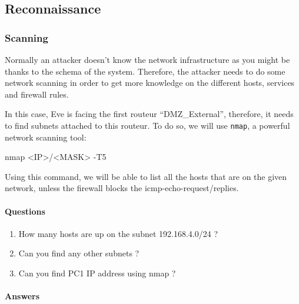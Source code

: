 \documentclass[a4paper,11pt,singlespacing]{article}
\newenvironment{Shaded}{}{}
\newcommand{\FunctionTok}[1]{\textcolor[rgb]{0.02,0.16,0.49}{#1}}
\newcommand{\NormalTok}[1]{#1}
\newcommand{\OperatorTok}[1]{\textcolor[rgb]{0.40,0.40,0.40}{#1}}
\providecommand{\tightlist}{%
  \setlength{\itemsep}{0pt}\setlength{\parskip}{0pt}}
\begin{document}
\newpage

\subsection{Reconnaissance}\label{reconnaissance}

\subsubsection{Scanning}\label{scanning}

Normally an attacker doesn't know the network infrastructure as you
might be thanks to the schema of the system. Therefore, the attacker
needs to do some network scanning in order to get more knowledge on the
different hosts, services and firewall rules.

In this case, Eve is facing the first routeur ``DMZ\_External'',
therefore, it needs to find subnets attached to this routeur. To do so,
we will use \texttt{nmap}, a powerful network scanning tool:

\begin{Shaded}
\begin{Highlighting}[]
\FunctionTok{nmap} \OperatorTok{\textless{}}\NormalTok{IP}\OperatorTok{\textgreater{}}\NormalTok{/}\OperatorTok{\textless{}}\NormalTok{MASK}\OperatorTok{\textgreater{}}\NormalTok{ {-}T5}
\end{Highlighting}
\end{Shaded}

Using this command, we will be able to list all the hosts that are on
the given network, unless the firewall blocks the
icmp-echo-request/replies.

\paragraph{Questions}\label{questions}

\begin{enumerate}
\def\labelenumi{\arabic{enumi}.}
\tightlist
\item
  How many hosts are up on the subnet 192.168.4.0/24 ?
\item
  Can you find any other subnets ?
\item
  Can you find PC1 IP address using nmap ?
\end{enumerate}

\pagebreak

\paragraph{Answers}\label{answers}
\end{document}
